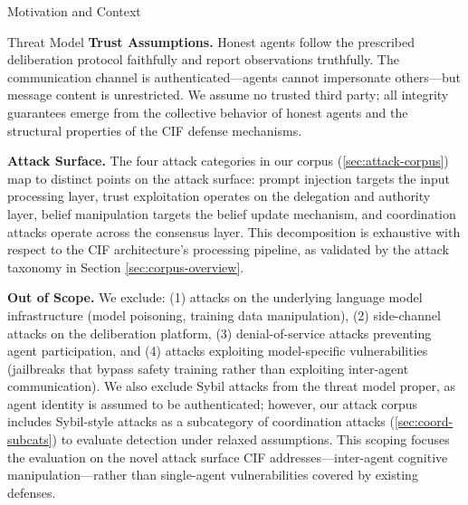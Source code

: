 \documentclass[
  ignorenonframetext,
]{beamer}
\begin{document}
\begin{frame}{Motivation and Context}
\begin{block}{Threat Model}
\textbf{Trust Assumptions.} Honest agents follow the prescribed
deliberation protocol faithfully and report observations truthfully. The
communication channel is authenticated---agents cannot impersonate
others---but message content is unrestricted. We assume no trusted third
party; all integrity guarantees emerge from the collective behavior of
honest agents and the structural properties of the CIF defense
mechanisms.

\textbf{Attack Surface.} The four attack categories in our corpus
(\cref{sec:attack-corpus}) map to distinct points on the attack surface:
prompt injection targets the input processing layer, trust exploitation
operates on the delegation and authority layer, belief manipulation
targets the belief update mechanism, and coordination attacks operate
across the consensus layer. This decomposition is exhaustive with
respect to the CIF architecture's processing pipeline, as validated by
the attack taxonomy in Section \ref{sec:corpus-overview}.

\textbf{Out of Scope.} We exclude: (1) attacks on the underlying
language model infrastructure (model poisoning, training data
manipulation), (2) side-channel attacks on the deliberation platform,
(3) denial-of-service attacks preventing agent participation, and (4)
attacks exploiting model-specific vulnerabilities (jailbreaks that
bypass safety training rather than exploiting inter-agent
communication). We also exclude Sybil attacks from the threat model
proper, as agent identity is assumed to be authenticated; however, our
attack corpus includes Sybil-style attacks as a subcategory of
coordination attacks (\cref{sec:coord-subcats}) to evaluate detection
under relaxed assumptions. This scoping focuses the evaluation on the
novel attack surface CIF addresses---inter-agent cognitive
manipulation---rather than single-agent vulnerabilities covered by
existing defenses.
\end{block}
\end{frame}
\end{document}
